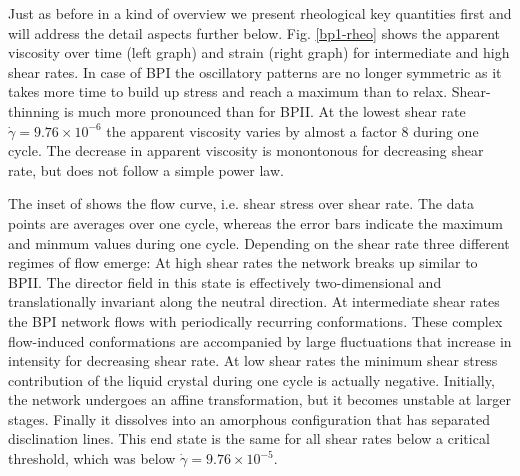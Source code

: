 \documentclass[aps,pre,reprint,superscriptaddress, twocolumn]{revtex4}
\newcommand{\e}[1]{\times10^{#1}}
\newcommand{\gd}{\dot{\gamma}}
\begin{document}
Just as before in a kind of overview we present rheological key quantities first and 
will address the detail aspects further below. 
Fig. \ref{bp1-rheo} shows the apparent viscosity over time (left graph) and 
strain (right graph) for intermediate and high shear rates. In case of BPI the oscillatory patterns
are no longer symmetric as it takes more time to build up stress and reach a maximum than to 
relax. Shear-thinning is much more pronounced than for BPII. At the lowest shear rate $\gd=9.76\e{-6}$
the apparent viscosity varies by almost a factor 8 during one cycle.
The decrease in apparent viscosity is monontonous for decreasing shear rate, but does not 
follow a simple power law. 

The inset of shows the flow curve, i.e. shear stress over shear rate.
The data points are averages over one cycle, whereas the error bars indicate the maximum and
minmum values during one cycle. Depending on the shear rate three different regimes of flow emerge:
At high shear rates the network breaks up similar to BPII. The director field in this state
is effectively two-dimensional and translationally invariant along the neutral direction.
At intermediate shear rates the BPI network flows with periodically recurring conformations.
These complex flow-induced conformations are accompanied by large fluctuations that increase 
in intensity for decreasing shear rate. At low shear rates the minimum shear stress contribution
of the liquid crystal during one cycle is actually negative. 
Initially, the network undergoes an affine transformation, but it becomes unstable at larger stages. 
Finally it dissolves into an amorphous configuration that has separated disclination lines. This 
end state is the same for all shear rates below a critical threshold, which was below $\gd=9.76\e{-5}$. 
\end{document}
